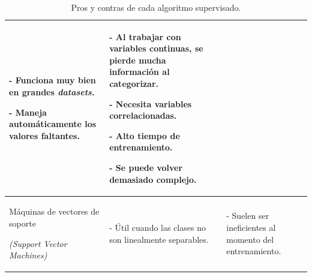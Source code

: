 \documentclass[a4paper,12pt]{article}
\begin{document}
\begin{landscape}
\begin{table}[]
\begin{tabularx}{\hsize}{|X|X|X|}
			- Funciona muy bien en grandes \textit{datasets}. 
						
			- Maneja automáticamente los valores faltantes. & 
			- Al trabajar con variables continuas, se pierde mucha información al categorizar.
						
			- Necesita variables correlacionadas.
						
			- Alto tiempo de entrenamiento.
						
			- Se puede volver demasiado complejo.
			\\ \hline
			Máquinas de vectores de soporte 
						
			\textit{(Support Vector Machines)}  & 
			- Útil cuando las clases no son linealmente separables.
			& 
			- Suelen ser ineficientes al momento del entrenamiento.
			\\ \hline
		\end{tabularx}
		\caption{Pros y contras de cada algoritmo supervisado.}
		\label{tab:pro-cons-supervised}
	\end{table}
		
\end{landscape}

{}

\end{document}
